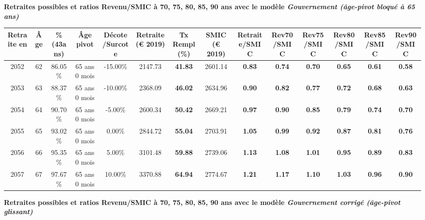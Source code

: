 {\bf \noindent Retraites possibles et ratios Revenu/SMIC à 70, 75, 80, 85, 90 ans avec le modèle \emph{Gouvernement (âge-pivot bloqué à 65 ans)}}  
 
\begin{adjustbox}{max width=\textwidth} 
\begin{tabular}[htb]{|c|c||c|c|c||c|c||c||c|c|c|c|c|c|} 
\hline 
 Retraite en &  Âge &  \%(43ans) &  Âge pivot &  Décote/Surcote &  Retraite (\euro{} 2019) &  Tx Rempl(\%) &  SMIC (\euro{} 2019) &  Retraite/SMIC &  Rev70/SMIC &  Rev75/SMIC &  Rev80/SMIC &  Rev85/SMIC &  Rev90/SMIC \\ 
\hline \hline 
 2052 &  62 &  86.05\% &  65 ans 0 mois &  -15.00\% &  2147.73 &  {\bf 41.83} &  2601.14 &  {\bf {\color{red} 0.83}} &  {\bf {\color{red} 0.74}} &  {\bf {\color{red} 0.70}} &  {\bf {\color{red} 0.65}} &  {\bf {\color{red} 0.61}} &  {\bf {\color{red} 0.58}} \\ 
\hline 
 2053 &  63 &  88.37\% &  65 ans 0 mois &  -10.00\% &  2368.09 &  {\bf 46.02} &  2634.96 &  {\bf {\color{red} 0.90}} &  {\bf {\color{red} 0.82}} &  {\bf {\color{red} 0.77}} &  {\bf {\color{red} 0.72}} &  {\bf {\color{red} 0.68}} &  {\bf {\color{red} 0.63}} \\ 
\hline 
 2054 &  64 &  90.70\% &  65 ans 0 mois &  -5.00\% &  2600.34 &  {\bf 50.42} &  2669.21 &  {\bf {\color{red} 0.97}} &  {\bf {\color{red} 0.90}} &  {\bf {\color{red} 0.85}} &  {\bf {\color{red} 0.79}} &  {\bf {\color{red} 0.74}} &  {\bf {\color{red} 0.70}} \\ 
\hline 
 2055 &  65 &  93.02\% &  65 ans 0 mois &  0.00\% &  2844.72 &  {\bf 55.04} &  2703.91 &  {\bf 1.05} &  {\bf {\color{red} 0.99}} &  {\bf {\color{red} 0.92}} &  {\bf {\color{red} 0.87}} &  {\bf {\color{red} 0.81}} &  {\bf {\color{red} 0.76}} \\ 
\hline 
 2056 &  66 &  95.35\% &  65 ans 0 mois &  5.00\% &  3101.48 &  {\bf 59.88} &  2739.06 &  {\bf 1.13} &  {\bf 1.08} &  {\bf 1.01} &  {\bf {\color{red} 0.95}} &  {\bf {\color{red} 0.89}} &  {\bf {\color{red} 0.83}} \\ 
\hline 
 2057 &  67 &  97.67\% &  65 ans 0 mois &  10.00\% &  3370.88 &  {\bf 64.94} &  2774.67 &  {\bf 1.21} &  {\bf 1.17} &  {\bf 1.10} &  {\bf 1.03} &  {\bf {\color{red} 0.96}} &  {\bf {\color{red} 0.90}} \\ 
\hline 
\hline 
\end{tabular} 
\end{adjustbox} 
 
 \vspace{0.1cm} 
{\bf \noindent Retraites possibles et ratios Revenu/SMIC à 70, 75, 80, 85, 90 ans avec le modèle \emph{Gouvernement corrigé (âge-pivot glissant)}}  
 
